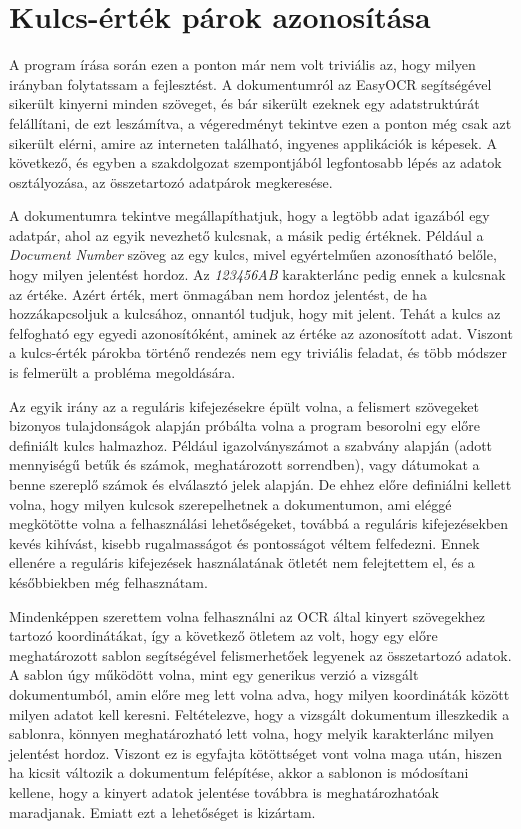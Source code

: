 \documentclass[12pt]{report}
\begin{document}
\section{Kulcs-érték párok azonosítása}

A program írása során ezen a ponton már nem volt triviális az, hogy milyen irányban folytatssam a fejlesztést. A dokumentumról az EasyOCR segítségével sikerült kinyerni minden szöveget, és bár sikerült ezeknek egy adatstruktúrát felállítani, de ezt leszámítva, a végeredményt tekintve ezen a ponton még csak azt sikerült elérni, amire az interneten található, ingyenes applikációk is képesek. A következő, és egyben a szakdolgozat szempontjából legfontosabb lépés az adatok osztályozása, az összetartozó adatpárok megkeresése.

A dokumentumra tekintve megállapíthatjuk, hogy a legtöbb adat igazából egy adatpár, ahol az egyik nevezhető kulcsnak, a másik pedig értéknek. Például a \emph{Document Number} szöveg az egy kulcs, mivel egyértelműen azonosítható belőle, hogy milyen jelentést hordoz. Az \emph{123456AB} karakterlánc pedig ennek a kulcsnak az értéke. Azért érték, mert önmagában nem hordoz jelentést, de ha hozzákapcsoljuk a kulcsához, onnantól tudjuk, hogy mit jelent. Tehát a kulcs az felfogható egy egyedi azonosítóként, aminek az értéke az azonosított adat. Viszont a kulcs-érték párokba történő rendezés nem egy triviális feladat, és több módszer is felmerült a probléma megoldására.

Az egyik irány az a reguláris kifejezésekre épült volna, a felismert szövegeket bizonyos tulajdonságok alapján próbálta volna a program besorolni egy előre definiált kulcs halmazhoz. Például igazolványszámot a szabvány alapján (adott mennyiségű betűk és számok, meghatározott sorrendben), vagy dátumokat a benne szereplő számok és elválasztó jelek alapján. De ehhez előre definiálni kellett volna, hogy milyen kulcsok szerepelhetnek a dokumentumon, ami eléggé megkötötte volna a felhasználási lehetőségeket, továbbá a reguláris kifejezésekben kevés kihívást, kisebb rugalmasságot és pontosságot véltem felfedezni. Ennek ellenére a reguláris kifejezések használatának ötletét nem felejtettem el, és a későbbiekben még felhasznátam.

Mindenképpen szerettem volna felhasználni az OCR által kinyert szövegekhez tartozó koordinátákat, így a következő ötletem az volt, hogy egy előre meghatározott sablon segítségével felismerhetőek legyenek az összetartozó adatok. A sablon úgy működött volna, mint egy generikus verzió a vizsgált dokumentumból, amin előre meg lett volna adva, hogy milyen koordináták között milyen adatot kell keresni. Feltételezve, hogy a vizsgált dokumentum illeszkedik a sablonra, könnyen meghatározható lett volna, hogy melyik karakterlánc milyen jelentést hordoz. Viszont ez is egyfajta kötöttséget vont volna maga után, hiszen ha kicsit változik a dokumentum felépítése, akkor a sablonon is módosítani kellene, hogy a kinyert adatok jelentése továbbra is meghatározhatóak maradjanak. Emiatt ezt a lehetőséget is kizártam.
\end{document}
